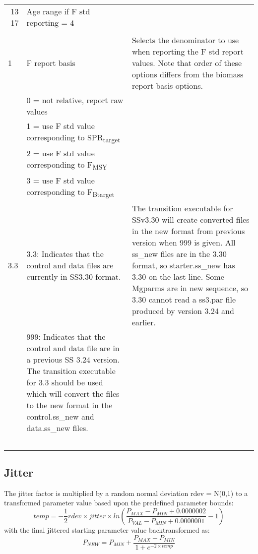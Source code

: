 \begin{landscape}
\begin{longtable}{p{3cm} p{7cm} p{11cm}}
 \multicolumn{1}{r}{13 17}  & Age range if F std reporting = 4 & \\
  \\

 \hline
 1 & F report basis &  \multirow{1}{1cm}[-0.1cm]{\parbox{11cm}{Selects the denominator to use when reporting the F std report values.  Note that order of these options differs from the biomass report basis options.}}\\
   & 0 = not relative, report raw values & \\
   & 1 = use F std value corresponding to SPR\textsubscript{target} & \\
   & 2 = use F std value corresponding to F\textsubscript{MSY} & \\
   & 3 = use F std value corresponding to F\textsubscript{Btarget} & \\
  
 \hline
 \hypertarget{Convert}{3.3} & 3.3: Indicates that the control and data files are currently in SS3.30 format. 
	 & \multirow{1}{1cm}[-0.1cm]{\parbox{11cm}{The transition executable for SSv3.30 will create converted files in the new format from previous version when 999 is given.  All ss\_new files are in the 3.30 format, so starter.ss\_new has 3.30 on the last line.  Some Mgparms are in new sequence, so 3.30 cannot read a ss3.par file produced by version 3.24 and earlier. }}\\
     & \multirow{1}{1cm}[-0.1cm]{\parbox{7cm}{999: Indicates that the control and data file are in a previous SS 3.24 version.  The transition executable for 3.3 should be used which will convert the files to the new format in the control.ss\_new and data.ss\_new files.}}  & \\  
     & & \\  
	 & & \\
     & & \\
   	 & & \\
     & & \\
    
    	
\end{longtable}
\end{landscape}
\restoregeometry

\subsection{Jitter}
\hypertarget{Jitter}{}
The jitter factor is multiplied by a random normal deviation rdev = N(0,1) to a transformed parameter value based upon the predefined parameter bounds:
\begin{equation}
temp = -\frac{1}{2}rdev \times jitter \times ln(\frac{P_{MAX} - P_{MIN} + 0.0000002}{P_{VAL}-P_{MIN} + 0.0000001}-1)
\end{equation}
with the final jittered starting parameter value backtransformed as:
\begin{equation}
P_{NEW} = P_{MIN} + \frac{P_{MAX}-P_{MIN}}{1+e^{-2 \times temp}}
\end{equation}